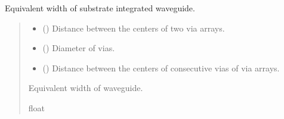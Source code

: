\documentclass[letterpaper,10pt,english]{sphinxmanual}
\begin{document}

\begin{fulllineitems}
\label{\detokenize{components:components.SIW_EquivalentWidth}}
\pysigstartsignatures
{}
\pysigstopsignatures
\sphinxAtStartPar
Equivalent width of substrate integrated waveguide.
\begin{quote}\begin{description}
\begin{itemize}
\item {}
\sphinxAtStartPar
{} () \textendash{} Distance between the centers of two via arrays.

\item {}
\sphinxAtStartPar
{} () \textendash{} Diameter of vias.

\item {}
\sphinxAtStartPar
{} () \textendash{} Distance between the centers of consecutive vias of via arrays.

\end{itemize}

\sphinxAtStartPar
Equivalent width of waveguide.

\sphinxAtStartPar
float

\end{description}\end{quote}

\end{fulllineitems}

\end{document}
